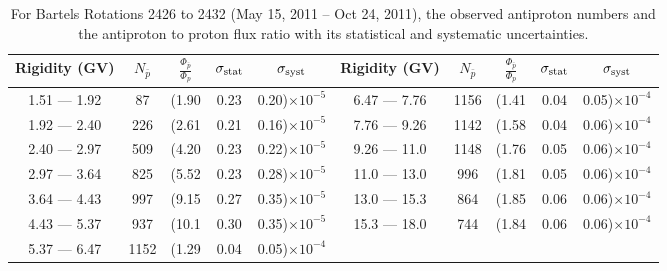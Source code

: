 \begin{table}[p] 
\renewcommand\baselinestretch{1.3}\selectfont
\setlength\tabcolsep{3pt}
\centering
\begin{tabular}{ccccc | ccccc}
\hline
\textbf{Rigidity}  (GV)  & $N_{\bar{p}}$ & $\frac{\Phi_{\bar{p}}}{\Phi_{p}}$ & $\sigma_{\rm{stat}}$ & $\sigma_{\rm{syst}}$ \hspace{1cm}  & \textbf{Rigidity}  (GV)  & $N_{\bar{p}}$ & $\frac{\Phi_{\bar{p}}}{\Phi_{p}}$ & $\sigma_{\rm{stat}}$ & $\sigma_{\rm{syst}}$ \hspace{1cm} \\ 
\hline
1.51 — 1.92   &  87                  &(1.90                          &  0.23              &      0.20)$\times 10^{-5}$  & 6.47 — 7.76                &  1156                    &(1.41                                &  0.04                   &      0.05)$\times 10^{-4}$\\
1.92 — 2.40   &  226                &(2.61                          &  0.21              &      0.16)$\times 10^{-5}$  & 7.76 — 9.26                &  1142                    &(1.58                                &  0.04                   &      0.06)$\times 10^{-4}$\\
2.40 — 2.97   &  509                &(4.20                          &  0.23              &      0.22)$\times 10^{-5}$  & 9.26 — 11.0                &  1148                    &(1.76                                &  0.05                   &      0.06)$\times 10^{-4}$\\    
2.97 — 3.64   &  825                &(5.52                          &  0.23              &      0.28)$\times 10^{-5}$  & 11.0 — 13.0                &  996                    &(1.81                                &  0.05                   &      0.06)$\times 10^{-4}$\\    
3.64 — 4.43   &  997                &(9.15                          &  0.27              &      0.35)$\times 10^{-5}$  & 13.0 — 15.3               &  864                    &(1.85                                & 0.06                  &      0.06)$\times 10^{-4}$\\
4.43 — 5.37   &  937                &(10.1                          &  0.30              &      0.35)$\times 10^{-5}$  & 15.3 — 18.0               &  744                    &(1.84                                & 0.06                  &      0.06)$\times 10^{-4}$\\
5.37 — 6.47   &  1152              &(1.29                          &  0.04              &      0.05)$\times 10^{-4}$ & \\
\hline
\end{tabular}
\caption[Antiproton to proton flux ratio for Bartels Rotations 2426 to 2432]{For Bartels Rotations 2426 to 2432 (May 15, 2011 – Oct 24, 2011), the observed antiproton numbers and the antiproton to proton flux ratio with its statistical and systematic uncertainties.}
\label{TableOfDependent1}
\end{table}

